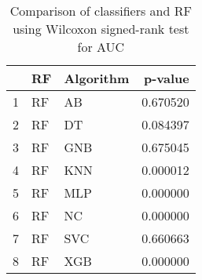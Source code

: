 \begin{table}
\footnotesize
\caption{Comparison of classifiers and RF using Wilcoxon signed-rank test for AUC}
\label{tab:RF wilcoxon AUC comparison}
\begin{tabular}{lllr}
\hline
 & RF & Algorithm & p-value \\
\hline
1 & RF & AB & 0.670520 \\
2 & RF & DT & 0.084397 \\
3 & RF & GNB & 0.675045 \\
4 & RF & KNN & 0.000012 \\
5 & RF & MLP & 0.000000 \\
6 & RF & NC & 0.000000 \\
7 & RF & SVC & 0.660663 \\
8 & RF & XGB & 0.000000 \\
\hline
\end{tabular}
\end{table}
